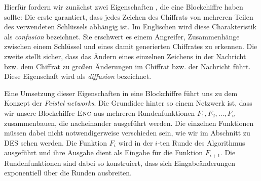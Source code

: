 Hierfür fordern wir zunächst zwei Eigenschaften \cite{Shannon1949}, die eine Blockchiffre haben sollte:
Die erste garantiert, dass jedes Zeichen des Chiffrats von mehreren Teilen des verwendeten Schlüssels abhängig ist. Im Englischen wird diese Charakteristik als \emph{confusion} \indexConfusion bezeichnet. Sie erschwert es einem Angreifer, Zusammenhänge zwischen einem Schlüssel und eines damit generierten Chiffrates zu erkennen. 
Die zweite stellt sicher, dass das Ändern eines einzelnen Zeichens in der Nachricht bzw. dem Chiffrat zu großen Änderungen im Chiffrat bzw. der Nachricht führt. Diese Eigenschaft wird als \emph{diffusion} \indexDiffusion bezeichnet.

Eine Umsetzung dieser Eigenschaften in eine Blockchiffre führt uns zu dem Konzept der \emph{Feistel networks}\indexFeistel.
Die Grundidee hinter so einem Netzwerk ist, dass wir unsere Blockchiffre \(\textsc{Enc}\) aus mehreren Rundenfunktionen \(F_1, F_2,\dots, F_n\) zusammenbauen, die nacheinander ausgeführt werden. Die einzelnen Funktionen müssen dabei nicht notwendigerweise verschieden sein, wie wir im Abschnitt zu DES sehen werden. Die Funktion \(F_i\) wird in der $i$-ten Runde des Algorithmus ausgeführt und ihre Ausgabe dient als Eingabe für die Funktion \(F_{i+1}\). Die Rundenfunktionen sind dabei so konstruiert, dass sich Eingabeänderungen exponentiell über die Runden ausbreiten.

